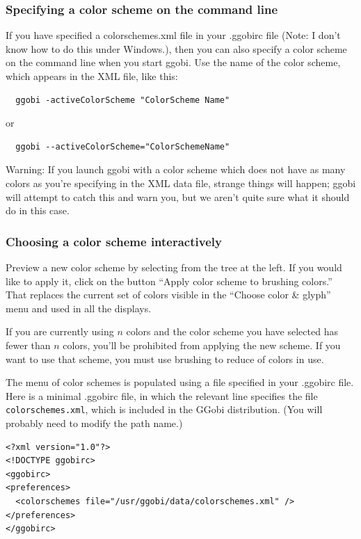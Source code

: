 \documentclass[11pt]{article}
\begin{document}
\subsubsection{Specifying a color scheme on the command line}

If you have specified a colorschemes.xml file in your .ggobirc file
(Note: I don't know how to do this under Windows.),
then you can also specify a color scheme on the command line when you
start ggobi.  Use the name of the color scheme, which appears in the
XML file, like this:

\begin{verbatim}
  ggobi -activeColorScheme "ColorScheme Name"
\end{verbatim}
  or   
\begin{verbatim}
  ggobi --activeColorScheme="ColorSchemeName"
\end{verbatim}

Warning: If you launch ggobi with a color scheme which does not have
as many colors as you're specifying in the XML data file, strange
things will happen; ggobi will attempt to catch this and warn you,
but we aren't quite sure what it should do in this case.

\subsubsection{Choosing a color scheme interactively}

Preview a new color scheme by selecting from the tree at the left.
If you would like to apply it, click on the button ``Apply color scheme
to brushing colors.''  That replaces the current set of colors visible
in the ``Choose color \& glyph'' menu and used in all the displays.

If you are currently using $n$ colors and the color scheme you have
selected has fewer than $n$ colors, you'll be prohibited from applying
the new scheme.  If you want to use that scheme, you must use brushing
to reduce of colors in use.

The menu of color schemes is populated using a file specified in your
.ggobirc file.  Here is a minimal .ggobirc file, in which the relevant
line specifies the file {\tt colorschemes.xml}, which is included in the
GGobi distribution.  (You will probably need to modify the path name.)

\begin{verbatim}
<?xml version="1.0"?>
<!DOCTYPE ggobirc>
<ggobirc>
<preferences>
  <colorschemes file="/usr/ggobi/data/colorschemes.xml" />
</preferences>
</ggobirc>
\end{verbatim}
\end{document}
